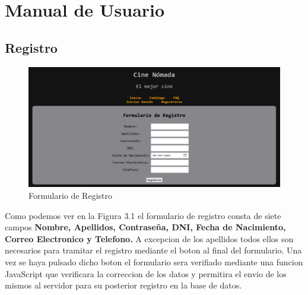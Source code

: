 \documentclass{report}
\begin{document}
    \chapter{Manual de Usuario}
        \section{Registro}
            \begin{figure}[h!]
                \centering
                \includegraphics[width=\textwidth]{./img/ui/register.png}
                \caption{Formulario de Registro}
            \end{figure}
            Como podemos ver en la Figura 3.1 el formulario de registro consta de siete campos \textbf{Nombre, Apellidos, Contraseña, DNI, Fecha de Nacimiento, Correo Electronico y Telefono.} A excepcion de los apellidos todos ellos son necesarios para tramitar el registro mediante el boton al final del formulario. Una vez se haya pulsado dicho boton el formulario sera verifiado mediante una funcion JavaScript que verificara la correccion de los datos y permitira el envio de los mismos al servidor para su posterior registro en la base de datos.
        
        \clearpage
\end{document}
